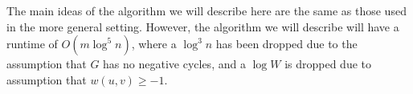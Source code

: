 \documentclass[11pt]{article}
\begin{document}
The main ideas of the algorithm we will describe here are the same as those used in the more general setting.
However, the algorithm we will describe will have a runtime of $O \left(m \log^5 n \right)$, where a $\log ^3 n$ has been dropped due to the assumption that $G$ has no negative cycles, and a $\log W$ is dropped due to assumption that $w(u,v) \geq -1$.





\end{document}
